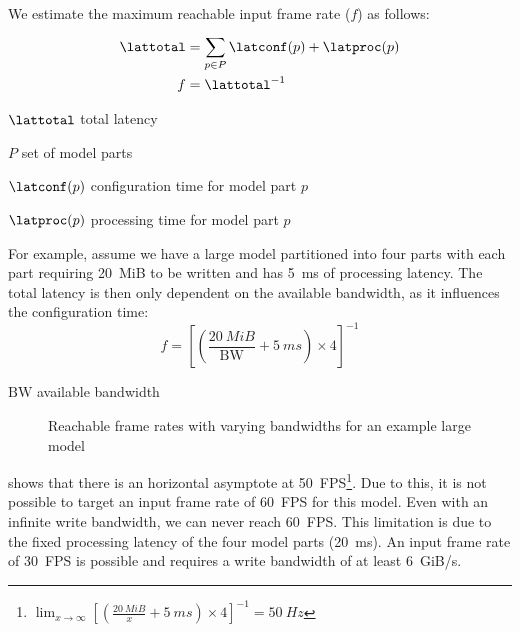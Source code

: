 We estimate the maximum reachable input frame rate ($f$) as follows:
\begin{align*} 
    \lattotal &= \sum_{p \in P}^{}{\latconf(p) + \latproc(p)} \\
    f &= \lattotal^{-1}
\end{align*}

\begin{eqexpl}[15mm]
    \item{$\lattotal$} total latency
    \item{$P$} set of model parts
    \item{$\latconf(p)$} configuration time for model part $p$
    \item{$\latproc(p)$} processing time for model part $p$
\end{eqexpl}

For example, assume we have a large model partitioned into four parts with each part requiring \SI{20}{MiB} to be written and has \SI{5}{ms} of processing latency.
The total latency is then only dependent on the available bandwidth, as it influences the configuration time:
\begin{equation*}
    f = \left[ \left( \frac{\SI{20}{MiB}}{\textrm{BW}} + \SI{5}{ms} \right) \times 4 \right]^{-1}
\end{equation*}

\begin{eqexpl}[15mm]
    \item{$\textrm{BW}$} available bandwidth
\end{eqexpl}

\begin{figure}
    \centering
    
    \caption{Reachable frame rates with varying bandwidths for an example large model}
    \label{fig:large_model_bandwidth_analysis_example}
\end{figure}

 shows that there is an horizontal asymptote at \SI{50}{FPS}\footnote{ $\lim_{x \to \infty} \left[ \left( \frac{\SI{20}{MiB}}{x} + \SI{5}{ms} \right) \times 4 \right]^{-1} = \SI{50}{Hz}$}.
Due to this, it is not possible to target an input frame rate of \SI{60}{FPS} for this model.
Even with an infinite write bandwidth, we can never reach \SI{60}{FPS}.
This limitation is due to the fixed processing latency of the four model parts (\SI{20}{ms}).
An input frame rate of \SI{30}{FPS} is possible and requires a write bandwidth of at least \SI{6}{GiB/s}.

